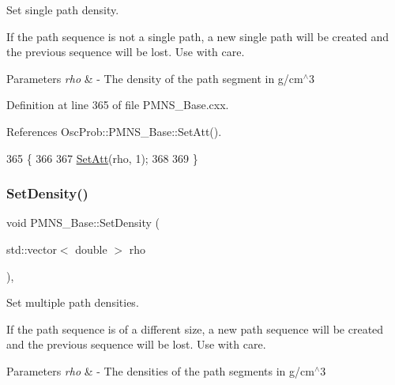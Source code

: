 Set single path density.

If the path sequence is not a single path, a new single path will be created and the previous sequence will be lost. Use with care.


\begin{DoxyParams}{Parameters}
{\em rho} & -\/ The density of the path segment in g/cm$^\wedge$3 \\
\hline
\end{DoxyParams}


Definition at line 365 of file P\+M\+N\+S\+\_\+\+Base.\+cxx.



References Osc\+Prob\+::\+P\+M\+N\+S\+\_\+\+Base\+::\+Set\+Att().


\begin{DoxyCode}
365                                     \{
366 
367   \hyperlink{classOscProb_1_1PMNS__Base_aba565962a440d14bee7a2a96d2eca2c5}{SetAtt}(rho, 1);
368 
369 \}
\end{DoxyCode}
\mbox{\label{classOscProb_1_1PMNS__Base_a858221d5510fe732dc6a101fd305cda0}} 
\subsubsection{\texorpdfstring{Set\+Density()}{SetDensity()}\hspace{0.1cm}{\footnotesize\ttfamily [2/2]}}
{\footnotesize\ttfamily void P\+M\+N\+S\+\_\+\+Base\+::\+Set\+Density (\begin{DoxyParamCaption}\item[{std\+::vector$<$ double $>$}]{rho }\end{DoxyParamCaption})\hspace{0.3cm}{\ttfamily [virtual]}, {\ttfamily [inherited]}}

Set multiple path densities.

If the path sequence is of a different size, a new path sequence will be created and the previous sequence will be lost. Use with care.


\begin{DoxyParams}{Parameters}
{\em rho} & -\/ The densities of the path segments in g/cm$^\wedge$3 \\
\hline
\end{DoxyParams}


